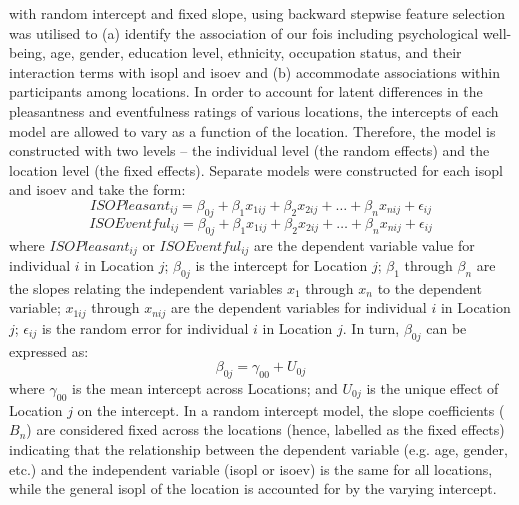  with random intercept and fixed slope, using backward stepwise feature selection was utilised to (a) identify the association of our \glspl{foi} including psychological well-being, age, gender, education level, ethnicity, occupation status, and their interaction terms with \gls{isopl} and \gls{isoev} and (b) accommodate associations within participants among locations. In order to account for latent differences in the pleasantness and eventfulness ratings of various locations, the intercepts of each model are allowed to vary as a function of the location. Therefore, the model is constructed with two levels -- the individual level (the random effects) and the location level (the fixed effects). Separate models were constructed for each \gls{isopl} and \gls{isoev} and take the form:
%
\begin{equation}
  \label{eqn:whoPl}
  ISOPleasant_{ij} = \beta_{0j} + \beta_1 x_{1ij} + \beta_2 x_{2ij} + \ldots + \beta_n x_{nij} + \epsilon_{ij}
\end{equation}
%
\begin{equation}
  \label{eqn:whoEv}
  ISOEventful_{ij} = \beta_{0j} + \beta_1 x_{1ij} + \beta_2 x_{2ij} + \ldots + \beta_n x_{nij} + \epsilon_{ij}
\end{equation}
%
where $ISOPleasant_{ij}$ or $ISOEventful_{ij}$ are the dependent variable value for individual $i$ in Location $j$; $\beta_{0j}$ is the intercept for Location $j$; $\beta_1$ through $\beta_n$ are the slopes relating the independent variables $x_1$ through $x_n$ to the dependent variable; $x_{1ij}$ through $x_{nij}$ are the dependent variables for individual $i$ in Location $j$; $\epsilon_{ij}$ is the random error for individual $i$ in Location $j$. In turn, $\beta_{0j}$ can be expressed as:
%
\begin{equation}
  \beta_{0j} = \gamma_{00} + U_{0j}
\end{equation}
%
where $\gamma_{00}$ is the mean intercept across Locations; and $U_{0j}$ is the unique effect of Location $j$ on the intercept. In a random intercept model, the slope coefficients ($B_n$) are considered fixed across the locations (hence, labelled as the fixed effects) indicating that the relationship between the dependent variable (e.g. age, gender, etc.) and the independent variable (\gls{isopl} or \gls{isoev}) is the same for all locations, while the general \gls{isopl} of the location is accounted for by the varying intercept.

